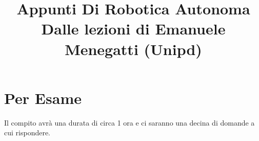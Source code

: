 \documentclass[a4paper,portrait,12pt]{article}
\theoremstyle{definition}
\begin{document}
\title{Appunti Di Robotica Autonoma\\
\vspace{1cm}
\large Dalle lezioni di Emanuele Menegatti (Unipd)}

\maketitle
\date
\newpage

\tableofcontents
\newpage



\section{Per Esame}



Il compito avrà una durata di circa 1 ora e ci saranno una decina di domande a cui rispondere.
\end{document}
